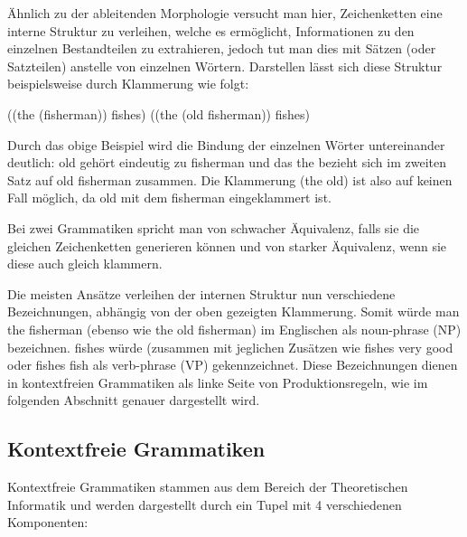 \documentclass[12pt]{report}
\begin{document}
Ähnlich zu der ableitenden Morphologie versucht man hier, Zeichenketten eine interne Struktur zu verleihen, welche es ermöglicht, Informationen zu den einzelnen Bestandteilen zu extrahieren, jedoch tut man dies mit Sätzen (oder Satzteilen) anstelle von einzelnen Wörtern. Darstellen lässt sich diese Struktur beispielsweise durch Klammerung wie folgt:

((the (fisherman)) fishes)
((the (old fisherman)) fishes)

Durch das obige Beispiel wird die Bindung der einzelnen Wörter untereinander deutlich: \glqq  old\grqq{} gehört eindeutig zu \glqq  fisherman\grqq{} und das \glqq  the\grqq{} bezieht sich im zweiten Satz auf \glqq  old fisherman\grqq{} zusammen. Die Klammerung (the old) ist also auf keinen Fall möglich, da \glqq  old\grqq{} mit dem \glqq  fisherman\grqq{} eingeklammert ist. 

Bei zwei Grammatiken spricht man von schwacher Äquivalenz, falls sie die gleichen Zeichenketten generieren können und von starker Äquivalenz, wenn sie diese auch gleich klammern. 

Die meisten Ansätze verleihen der internen Struktur nun verschiedene Bezeichnungen, abhängig von der oben gezeigten Klammerung. Somit würde man \glqq  the fisherman\grqq{} (ebenso wie \glqq  the old fisherman\grqq{}) im Englischen als \glqq  noun-phrase\grqq{} (NP) bezeichnen. \glqq  fishes\grqq{} würde (zusammen mit jeglichen Zusätzen wie \glqq  fishes very good\grqq{} oder \glqq  fishes fish\grqq{} als \glqq  verb-phrase\grqq{} (VP) gekennzeichnet. Diese Bezeichnungen dienen in kontextfreien Grammatiken als linke Seite von Produktionsregeln, wie im folgenden Abschnitt genauer dargestellt wird.

\subsection{Kontextfreie Grammatiken}
Kontextfreie Grammatiken stammen aus dem Bereich der Theoretischen Informatik und werden dargestellt durch ein Tupel mit 4 verschiedenen Komponenten:
\end{document}
